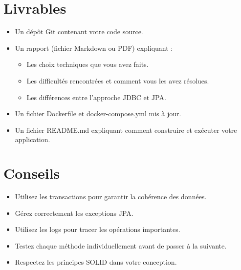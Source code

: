 \documentclass[11pt]{article}
\begin{document}
\section{Livrables}
\begin{itemize}
\item Un dépôt Git contenant votre code source.
\item Un rapport (fichier Markdown ou PDF) expliquant :
  \begin{itemize}
  \item Les choix techniques que vous avez faits.
  \item Les difficultés rencontrées et comment vous les avez résolues.
  \item Les différences entre l'approche JDBC et JPA.
  \end{itemize}
\item Un fichier Dockerfile et docker-compose.yml mis à jour.
\item Un fichier README.md expliquant comment construire et exécuter votre application.
\end{itemize}

\section{Conseils}
\begin{itemize}
\item Utilisez les transactions pour garantir la cohérence des données.
\item Gérez correctement les exceptions JPA.
\item Utilisez les logs pour tracer les opérations importantes.
\item Testez chaque méthode individuellement avant de passer à la suivante.
\item Respectez les principes SOLID dans votre conception.
\end{itemize}
\end{document}
